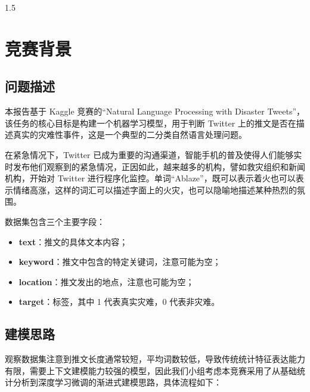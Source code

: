\documentclass[12pt, a4paper, UTF8]{ctexart}
\begin{document}
\cover
\thispagestyle{empty}
\clearpage
\begin{spacing}{1.5}
    \tableofcontents
\end{spacing}
\clearpage



\section{竞赛背景}
\subsection{问题描述}
本报告基于 Kaggle 竞赛的“Natural Language Processing with Disaster Tweets”，该任务的核心目标是构建一个机器学习模型，用于判断 Twitter 上的推文是否在描述真实的灾难性事件，这是一个典型的二分类自然语言处理问题。

在紧急情况下，Twitter 已成为重要的沟通渠道，智能手机的普及使得人们能够实时发布他们观察到的紧急情况，正因如此，越来越多的机构，譬如救灾组织和新闻机构，开始对 Twitter 进行程序化监控。单词“Ablaze”，既可以表示着火也可以表示情绪高涨，这样的词汇可以描述字面上的火灾，也可以隐喻地描述某种热烈的氛围。

数据集包含三个主要字段：

\begin{itemize}
    \item \textbf{text}：推文的具体文本内容；
    \item \textbf{keyword}：推文中包含的特定关键词，注意可能为空；
    \item \textbf{location}：推文发出的地点，注意也可能为空；
    \item \textbf{target}：标签，其中 1 代表真实灾难，0 代表非灾难。
\end{itemize}



\subsection{建模思路}
观察数据集注意到推文长度通常较短，平均词数较低，导致传统统计特征表达能力有限，需要上下文建模能力较强的模型，因此我们小组考虑本竞赛采用了从基础统计分析到深度学习微调的渐进式建模思路，具体流程如下：
\end{document}
